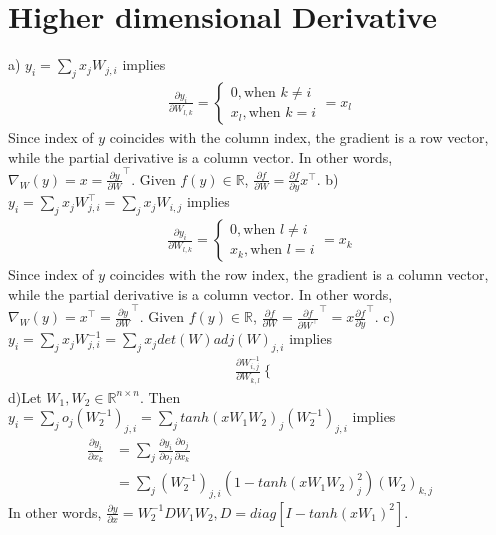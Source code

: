 \documentclass[10pt,a4paper,draft]{report}
\begin{document}
\section{Higher dimensional Derivative}
a) $y_i = \sum_{j}x_jW_{j,i}$ implies 
\begin{align*}
\frac{\partial y_i}{\partial W_{l,k}} =
	\begin{cases}
		0, \text{when } k \neq i\\
		x_l, \text{when } k = i
	\end{cases}
	= x_l
\end{align*}
Since index of $y$ coincides with the column index, the gradient is a row vector, while the partial derivative is a column vector. In other words, $\nabla_{W}(y) = x = \frac{\partial y}{\partial W}^\intercal$.
Given $f(y) \in \mathbb R$, $\frac{\partial f}{\partial W} = \frac{\partial f}{\partial y}x^\intercal$.
\newline
b)$y_i = \sum_{j}x_jW^\intercal_{j,i} = \sum_{j}x_jW_{i,j}$ implies 
\begin{align*}
\frac{\partial y_i}{\partial W_{l,k}} =
	\begin{cases}
		0, \text{when } l \neq i\\
		x_k, \text{when } l = i
	\end{cases}
	= x_k
\end{align*}
Since index of $y$ coincides with the row index, the gradient is a column vector, while the partial derivative is a column vector. In other words, $\nabla_{W}(y) = x^\intercal = \frac{\partial y}{\partial W}^\intercal$.
Given $f(y) \in \mathbb R$, $\frac{\partial f}{\partial W} = \frac{\partial f}{\partial W^\intercal}^\intercal = x\frac{\partial f}{\partial y}^\intercal$.
\newline
c)$y_i = \sum_{j}x_jW^{-1}_{j,i} = \sum_{j}x_j det(W) adj(W)_{j,i}$ implies 
\begin{align*}
\frac{\partial W^{-1}_{i,j}}{\partial W_{k,l}}
	\begin{cases}
	\end{cases}
\end{align*}
\newline
d)Let $W_1,W_2 \in\mathbb R^{n\times n}$. Then $y_i = \sum_{j}o_j(W_2^{-1})_{j,i} = \sum_{j}tanh(xW_1W_2)_j(W_2^{-1})_{j,i}$ implies 
\begin{align*}
\frac{\partial y_i}{\partial x_k} 
  &= \sum_{j}\frac{\partial y_i}{\partial o_j}\frac{\partial o_j}{\partial x_k}\\
  &= \sum_{j}(W_2^{-1})_{j,i}(1-tanh(xW_1W_2)_j^2)(W_2)_{k,j}
\end{align*}
In other words, $\frac{\partial y}{\partial x} = W_2^{-1} D W_1W_2, D = diag[I-tanh(xW_1)^2].$
\end{document}
